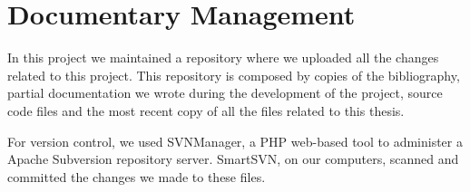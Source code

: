 \bigskip
\section{Documentary Management}
In this project we maintained a repository where we uploaded all the changes related to this project. This repository is composed
by copies of the bibliography, partial documentation we wrote during the development of the project, source code files and the most
recent copy of all the files related to this thesis.

For version control, we used SVNManager, a PHP web-based tool to administer a Apache Subversion repository server. SmartSVN, on
our computers, scanned and committed the changes we made to these files.
